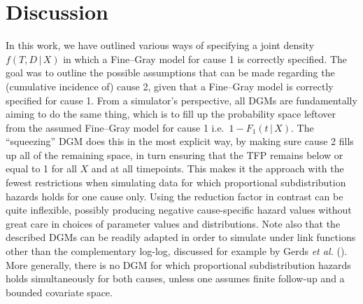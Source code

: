 \documentclass[
  letterpaper,
  DIV=11,
  numbers=noendperiod]{scrreprt}
\newcommand{\given}{\,|\,}
\begin{document}
\section{Discussion}\label{discussion}

In this work, we have outlined various ways of specifying a joint
density \(f(T, D \given X)\) in which a Fine--Gray model for cause 1 is
correctly specified. The goal was to outline the possible assumptions
that can be made regarding the (cumulative incidence of) cause 2, given
that a Fine--Gray model is correctly specified for cause 1. From a
simulator's perspective, all DGMs are fundamentally aiming to do the
same thing, which is to fill up the probability space leftover from the
assumed Fine--Gray model for cause 1 i.e.~\(1 - F_1(t \given X)\). The
``squeezing'' DGM does this in the most explicit way, by making sure
cause 2 fills up all of the remaining space, in turn ensuring that the
TFP remains below or equal to 1 for all \(X\) and at all timepoints.
This makes it the approach with the fewest restrictions when simulating
data for which proportional subdistribution hazards holds for one cause
only. Using the reduction factor in contrast can be quite inflexible,
possibly producing negative cause-specific hazard values without great
care in choices of parameter values and distributions. Note also that
the described DGMs can be readily adapted in order to simulate under
link functions other than the complementary log-log, discussed for
example by Gerds \emph{et al.}
(). More generally,
there is no DGM for which proportional subdistribution hazards holds
simultaneously for both causes, unless one assumes finite follow-up and
a bounded covariate space.
\end{document}
